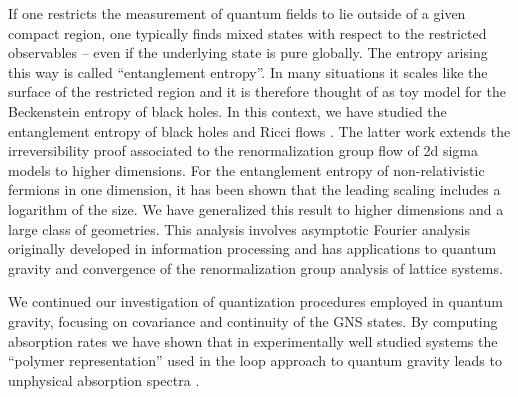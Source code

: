  If one restricts the measurement
of quantum fields to lie outside of a given compact region, one
typically finds mixed states with respect to the restricted
observables -- even if the underlying state is pure globally. The
entropy arising this way is called ``entanglement entropy''. In many
situations it scales like the surface of the restricted region and
it is therefore thought of as toy model for the Beckenstein entropy
of black holes. In this context, we have studied the entanglement
entropy of black holes and Ricci flows
\cite{Solodukhin:2006ic,Solodukhin:2006xv}. The latter work extends
the irreversibility proof associated to the renormalization group
flow of 2d sigma models to higher dimensions. For the entanglement
entropy of non-relativistic fermions in one dimension, it has been
shown that the leading scaling includes a logarithm of the size. We
have generalized this result to higher dimensions and a large class
of geometries. This analysis involves asymptotic Fourier analysis
originally developed in information processing and has applications
to quantum gravity and convergence of the renormalization group
analysis of lattice systems.

 We continued our investigation of
quantization procedures employed in quantum gravity,  focusing on
covariance and continuity of the GNS states. By computing absorption
rates we have shown that in experimentally well studied systems the
``polymer representation'' used in the loop approach to quantum
gravity leads to unphysical absorption spectra
\cite{Helling:2006yn}.



